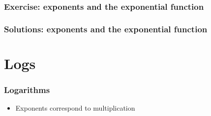 \documentclass[12pt]{beamer}
\newcommand{\myframe}[1]{\begin{frame} \frametitle{#1}}
\begin{document}
\myframe{Exercise: exponents and the exponential function}

\end{frame}

\myframe{Solutions: exponents and the exponential function}

\end{frame}

\section{Logs}
\myframe{Logarithms}
\begin{itemize}
\item Exponents correspond to multiplication
\end{itemize}
\end{frame}
\end{document}
